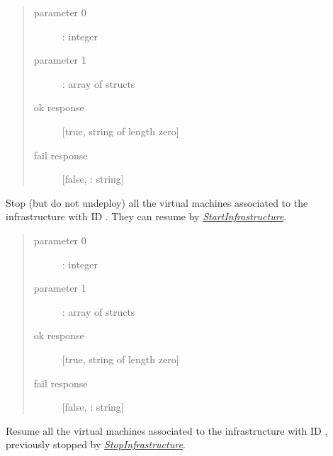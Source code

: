 \documentclass[letterpaper,10pt,english]{sphinxmanual}
\begin{document}
\label{xmlrpc:stopinfrastructure-xmlrpc}\begin{description}
\item[{}] \leavevmode\begin{quote}\begin{description}
\item[{parameter 0}] \leavevmode
{}: integer

\item[{parameter 1}] \leavevmode
{}: array of structs

\item[{ok response}] \leavevmode
{[}true, string of length zero{]}

\item[{fail response}] \leavevmode
{[}false, : string{]}

\end{description}\end{quote}

Stop (but do not undeploy) all the virtual machines associated to the
infrastructure with ID . They can resume by
{\hyperref[xmlrpc:startinfrastructure-xmlrpc]{\emph{StartInfrastructure}}}.

\end{description}
\label{xmlrpc:startinfrastructure-xmlrpc}\begin{description}
\item[{}] \leavevmode\begin{quote}\begin{description}
\item[{parameter 0}] \leavevmode
{}: integer

\item[{parameter 1}] \leavevmode
{}: array of structs

\item[{ok response}] \leavevmode
{[}true, string of length zero{]}

\item[{fail response}] \leavevmode
{[}false, : string{]}

\end{description}\end{quote}

Resume all the virtual machines associated to the
infrastructure with ID , previously stopped by
{\hyperref[xmlrpc:stopinfrastructure-xmlrpc]{\emph{StopInfrastructure}}}.

\end{description}
\end{document}
